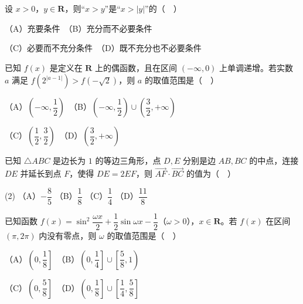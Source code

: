 \begin{question}
设 \(x>0\)，\(y\in\mathbf{R}\)，则“\(x>y\)”是“\(x>|y|\)”的（　）

（A）充要条件　（B）充分而不必要条件

（C）必要而不充分条件　（D）既不充分也不必要条件

\end{question}
\begin{question}
已知 \(f(x)\) 是定义在 \(\mathbf{R}\) 上的偶函数，且在区间 \((-\infty,0)\) 上单调递增。若实数 \(a\) 满足 \(f\left(2^{|a-1|}\right)>f\left(-\sqrt{2}\right)\)，则 \(a\) 的取值范围是（　）

（A）\(\left(-\infty,\dfrac{1}{2}\right)\)　（B）\(\left(-\infty,\dfrac{1}{2}\right)\cup\left(\dfrac{3}{2},+\infty\right)\)

（C）\(\left(\dfrac{1}{2},\dfrac{3}{2}\right)\)　（D）\(\left(\dfrac{3}{2},+\infty\right)\)

\end{question}
\begin{question}
已知 \(\triangle ABC\) 是边长为 \(1\) 的等边三角形，点 \(D,E\) 分别是边 \(AB,BC\) 的中点，连接 \(DE\) 并延长到点 \(F\)，使得 \(DE=2EF\)，则 \(\overrightarrow{AF}\cdot\overrightarrow{BC}\) 的值为（　）

\begin{gkopts}(2)
\task （A）\(-\dfrac{8}{5}\)
\task （B）\(\dfrac{1}{8}\)
\task （C）\(\dfrac{1}{4}\)
\task （D）\(\dfrac{11}{8}\)
\end{gkopts}

\end{question}
\begin{question}
已知函数 \(f(x)=\sin^{2}\dfrac{\omega x}{2}+\dfrac{1}{2}\sin\omega x-\dfrac{1}{2}\)（\(\omega>0\)），\(x\in\mathbf{R}\)。若 \(f(x)\) 在区间 \((\pi,2\pi)\) 内没有零点，则 \(\omega\) 的取值范围是（　）

（A）\(\left(0,\dfrac{1}{8}\right]\)　（B）\(\left(0,\dfrac{1}{4}\right]\cup\left[\dfrac{5}{8},1\right)\)

（C）\(\left(0,\dfrac{5}{8}\right]\)　（D）\(\left(0,\dfrac{1}{8}\right]\cup\left[\dfrac{1}{4},\dfrac{5}{8}\right]\)

\end{question}


